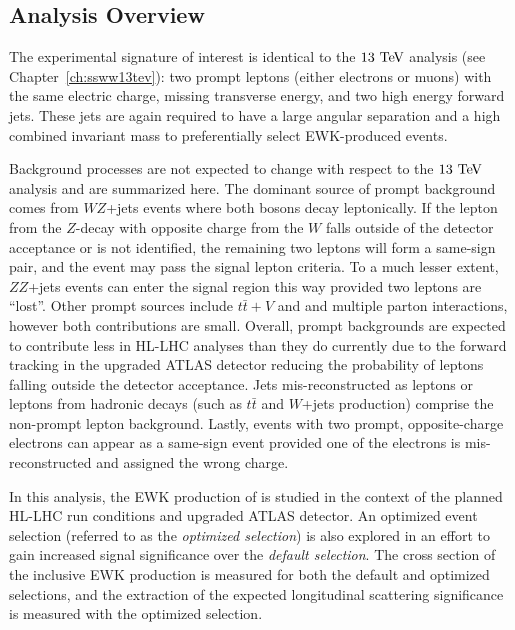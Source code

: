 \subsection{Analysis Overview}
The experimental signature of interest is identical to the $13\tev$ analysis (see Chapter~\ref{ch:ssww13tev}): two prompt leptons (either electrons or muons) with the same electric charge, missing transverse energy, and two high energy forward jets.
These jets are again required to have a large angular separation and a high combined invariant mass to preferentially select EWK-produced \ssww events.

Background processes are not expected to change with respect to the $13\tev$ analysis and are summarized here. %
The dominant source of prompt background comes from $WZ$+jets events where both bosons decay leptonically.  
If the lepton from the $Z$-decay with opposite charge from the $W$ falls outside of the detector acceptance or is not identified, the remaining two leptons will form a same-sign pair, and the event may pass the signal lepton criteria.
To a much lesser extent, $ZZ$+jets events can enter the signal region this way provided two leptons are ``lost''.
Other prompt sources include $t\bar{t}+V$ and and multiple parton interactions, however both contributions are small.
Overall, prompt backgrounds are expected to contribute less in HL-LHC analyses than they do currently due to the forward tracking in the upgraded ATLAS detector reducing the probability of leptons falling outside the detector acceptance.
Jets mis-reconstructed as leptons or leptons from hadronic decays (such as $t\bar{t}$ and $W$+jets production) comprise the non-prompt lepton background.
Lastly, events with two prompt, opposite-charge electrons can appear as a same-sign event provided one of the electrons is mis-reconstructed and assigned the wrong charge.

In this analysis, the EWK production of \ssww is studied in the context of the planned HL-LHC run conditions and upgraded ATLAS detector.
An optimized event selection (referred to as the \emph{optimized selection}) is also explored in an effort to gain increased signal significance over the \emph{default selection}. %
The cross section of the inclusive EWK production is measured for both the default and optimized selections, and the extraction of the expected longitudinal scattering significance is measured with the optimized selection.

